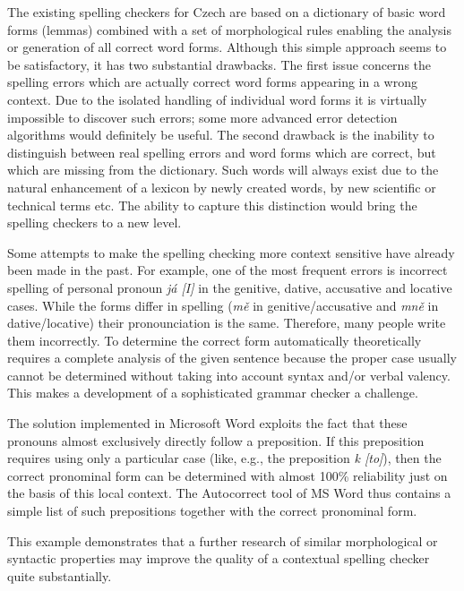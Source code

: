 \begin{multicols}{2}
The existing spelling checkers for Czech are based on a dictionary of basic word forms (lemmas) combined with a set of morphological rules enabling the analysis or generation of all correct word forms. Although this simple approach seems to be satisfactory, it has two substantial drawbacks. The first issue concerns the spelling errors which are actually correct word forms appearing in a wrong context. Due to the isolated handling of individual word forms it is virtually impossible to discover such errors; some more advanced error detection algorithms would definitely be useful. The second drawback is the inability to distinguish between real spelling errors and word forms which are correct, but which are missing from the dictionary. Such words will always exist due to the natural enhancement of a lexicon by newly created words, by new scientific or technical terms etc. The ability to capture this distinction would bring the spelling checkers to a new level.

Some attempts to make the spelling checking more context sensitive have already been made in the past. For example, one of the most frequent errors is incorrect spelling of personal pronoun \textit{já {[}I{]}} in the genitive, dative, accusative and locative cases. While the forms differ in spelling (\textit{mě} in genitive/accusative and \textit{mně} in dative/locative) their pronounciation is the same. Therefore,  many people write them incorrectly. To determine the correct form automatically theoretically requires a complete analysis of the given sentence because the proper case usually cannot be determined without taking into account syntax and/or verbal valency. This makes a development of a sophisticated grammar checker a challenge.

The solution implemented in Microsoft Word exploits the fact that these pronouns almost exclusively directly follow a preposition. If this preposition requires using only a particular case (like, e.g., the preposition \textit{k {[}to{]}}), then the correct pronominal form can be determined with almost 100\% reliability just on the basis of this local context. The Autocorrect tool of MS Word thus contains a simple list of such prepositions together with the correct pronominal form.

This example demonstrates that a further research of similar morphological or syntactic properties may improve the quality of a contextual spelling checker quite substantially.


\end{multicols}
